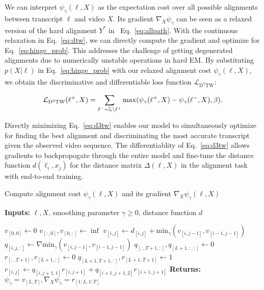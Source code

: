 \documentclass[10pt,twocolumn,letterpaper]{article}
\newcommand{\eqnref}[1]{{Eq.\ \eqref{eq:#1}}}
\begin{document}
We can interpret $\psi_{\gamma}(\ell, X)$ as the expectation cost over all possible alignments between transcript $\ell$ and video $X$. Its gradient $\nabla_X \psi_\gamma$ can be seen as a relaxed version of the hard alignment $Y^*$ in ~\eqnref{allpath}. With the continuous relaxation in \eqnref{dtw}, we can directly compute the gradient and optimize for \eqnref{hinge_prob}. This addresses the challenge of getting degenerated alignments due to numerically unstable operations in hard EM. By substituting $p(X|\ell)$ in \eqnref{hinge_prob} with our relaxed alignment cost $\psi_\gamma(\ell, X)$, we obtain the discriminative and differentiable loss function $\mathcal{L}_{\mathrm{D}^3\mathrm{TW}}$:

\begin{equation}
\vspace{-1mm}
\label{eq:d3tw}
\small
\mathcal{L}_{\mathrm{D}^3\mathrm{TW}}(\ell^+, X) = \sum_{\ell^- \sim \mathbb{L} \setminus \ell^+} \max (\psi_{\gamma}(\ell^+, X) - \psi_{\gamma}(\ell^-, X), \beta).
\end{equation}

Directly minimizing \eqnref{d3tw} enables our model to simultaneously optimize for finding the best alignment and discriminating the most accurate transcript given the observed video sequence. 
The differentiablity of \eqnref{d3tw} allows gradients to backpropogate through the entire model and fine-tune the distance function $d(\ell_i, x_j)$ for the distance matrix $\Delta(\ell, X)$ in the alignment task with end-to-end training. 



\begin{algorithm}[t]
\small
\caption{Compute alignment cost $\psi_\gamma(\ell, X)$ and its gradient $\nabla_X \psi_\gamma(\ell, X)$ }\label{algo:dtw}
\begin{algorithmic}[1]
\State \textbf{Inputs:} $\ell, X$, smoothing parameter $\gamma \ge 0$, distance function $d$

\State $v_{[0,0]} \gets 0$
\State $v_{[:,0]}, v_{[0, :]} \gets \inf$
    \State $v_{[i,j]} \gets d_{[i,j]} + \mathrm{min}_\gamma (v_{[i, j-1]}, v_{[i-1, j-1]})$
    \State $q_{[i,j,:]} \gets \nabla\mathrm{min}_\gamma (v_{[i, j-1]}, v_{[i-1, j-1]})$
\EndFor
\EndProcedure
{}
\State $q_{[:,T+1,:]}, q_{[L+1,:,:]} \gets 0$
\State $r_{[:,T+1]}, r_{[L+1, :]} \gets 0$
\State $q_{[L+1, T+1, :]}, r_{[L+1,T+1]} \gets 1$
    \State $r_{[i,j]} \gets q_{[i,j+1,1]} r_{[i,j+1]} + q_{[i+1, j+1, 2]} r_{[i+1, j+1]}$
\EndFor
\EndProcedure
\State \textbf{Returns:} $\psi_\gamma = v_{[L, T]}, \nabla_X \psi_\gamma = r_{[1:L,1:T]}$
\end{algorithmic}
\end{algorithm}
\end{document}
